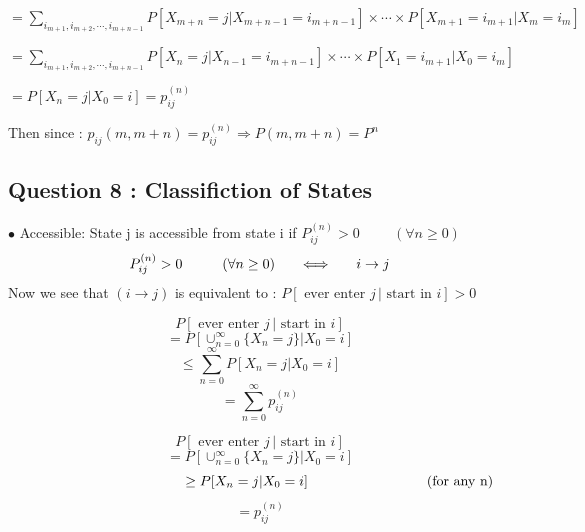 \documentclass[a4paper]{article}
\begin{document}
		$= \displaystyle{\sum_{i_{m+1}, i_{m+2} , \cdots , i_{m+n-1}} P[X_{m+n}=j|X_{m+n-1} = i_{m+n-1}]\times\cdots\times P[X_{m+1} = i_{m+1} | X_{m} = i_m]}$
		
		$= \displaystyle{\sum_{i_{m+1}, i_{m+2} , \cdots , i_{m+n-1}} P[X_{n}=j|X_{n-1} = i_{m+n-1}]\times\cdots\times P[X_{1} = i_{m+1} | X_{0} = i_m]}$
		\bigskip
		
		$= P[X_n = j | X_0 = i] = p^{(n)}_{ij}$
		
		Then since : $ p_{ij}(m,m+n) = p^{(n)}_{ij} \Longrightarrow  P(m , m+n) = P^n$
		
		\newpage
		
		\subsection{{\Large Question 8 :} Classifiction of States}
		
		$\bullet$ Accessible: State j is accessible from state i if $P^{(n)}_{ij} > 0 \hspace{1cm} (\forall n \geq 0)$\[P^{(n)}_{ij} > 0 \hspace{1cm} (\forall n \geq 0) \hspace{0.6cm}\Longleftrightarrow \hspace{0.6cm} i\rightarrow j\]
		Now we see that $ (i\rightarrow j)$ is equivalent to : $P[\text{ ever enter } j\,| \text{ start in } i ] > 0 $
		
		\[P[\text{ ever enter } j\,| \text{ start in } i ]\]	
		 \[= P[\cup_{n=0}^{\infty}\{X_n = j\} | X_0 = i]\]
		\[ \leq \sum_{n=0}^{\infty} P[X_n =j | X_0 = i]\]\[= \sum_{n=0}^{\infty} p^{(n)}_{ij}\]
		
		
		
		
		\[P[\text{ ever enter } j\,| \text{ start in } i ]\]	
		\[= P[\cup_{n=0}^{\infty}\{X_n = j\} | X_0 = i]\]\[ \hspace{4cm} \geq P[X_n =j | X_0 = i] \hspace*{3cm} \text{(for any n)}\]\[= p^{(n)}_{ij}\]
			
		\newpage
	
\end{document}
